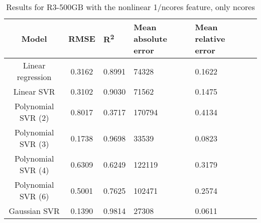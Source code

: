\begin{table}[H]
\centering
\begin{adjustbox}{center}
\begin{tabular}{c | c M{1.2cm} M{2.5cm} M{2.5cm} M{1.8cm}}
Model & RMSE & R\textsuperscript{2} & Mean absolute error & Mean relative error \tabularnewline
\hline
Linear regression & 0.3162 & 0.8991 &  74328 & 0.1622 \\
Linear SVR & 0.3102 & 0.9030 &  71562 & 0.1475 \\
Polynomial SVR (2) & 0.8017 & 0.3717 & 170794 & 0.4134 \\
Polynomial SVR (3) & 0.1738 & 0.9698 &  33539 & 0.0823 \\
Polynomial SVR (4) & 0.6309 & 0.6249 & 122119 & 0.3179 \\
Polynomial SVR (6) & 0.5001 & 0.7625 & 102471 & 0.2574 \\
Gaussian SVR & 0.1390 & 0.9814 &  27308 & 0.0611 \\
\end{tabular}
\end{adjustbox}
\\
\caption{Results for R3-500GB with the nonlinear 1/ncores feature, only ncores}
\label{tab:all_nonlinear_R3_500}
\end{table}
